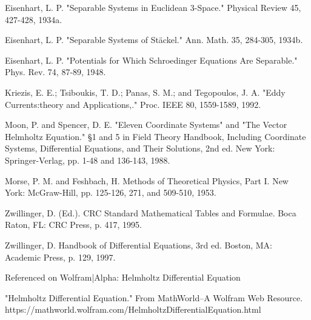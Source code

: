 \documentclass[a4paper]{article}
\begin{document}
\noindent {}

\noindent Eisenhart, L. P. "Separable Systems in Euclidean 3-Space." Physical Review 45, 427-428, 1934a.

\noindent Eisenhart, L. P. "Separable Systems of Stäckel." Ann. Math. 35, 284-305, 1934b.

\noindent Eisenhart, L. P. "Potentials for Which Schroedinger Equations Are Separable." Phys. Rev. 74, 87-89, 1948.

\noindent Kriezis, E. E.; Tsiboukis, T. D.; Panas, S. M.; and Tegopoulos, J. A. "Eddy Currents:theory and Applications,." Proc. IEEE 80, 1559-1589, 1992.

\noindent Moon, P. and Spencer, D. E. "Eleven Coordinate Systems" and "The Vector Helmholtz Equation." §1 and 5 in {\color{Emerald}Field Theory Handbook, Including Coordinate Systems, Differential Equations, and Their Solutions, 2nd ed.} New York: Springer-Verlag, pp. 1-48 and 136-143, 1988.

\noindent Morse, P. M. and Feshbach, H. {\color{Emerald}Methods of Theoretical Physics, Part I.} New York: McGraw-Hill, pp. 125-126, 271, and 509-510, 1953.

\noindent Zwillinger, D. (Ed.). {\color{Emerald}CRC Standard Mathematical Tables and Formulae.} Boca Raton, FL: CRC Press, p. 417, 1995.

\noindent Zwillinger, D. {\color{Emerald}Handbook of Differential Equations, 3rd ed.} Boston, MA: Academic Press, p. 129, 1997.

\noindent{\color{ForestGreen}\rule{7cm}{0.1mm}}

\noindent Referenced on Wolfram|Alpha: Helmholtz Differential Equation

\noindent{\color{ForestGreen}\rule{7cm}{0.1mm}} \vspace{0.3cm}

\noindent {} 

 "Helmholtz Differential Equation." From {\color{Emerald}MathWorld}--A Wolfram Web Resource. {\color{NavyBlue}https://mathworld.wolfram.com/HelmholtzDifferentialEquation.html}
\end{document}
